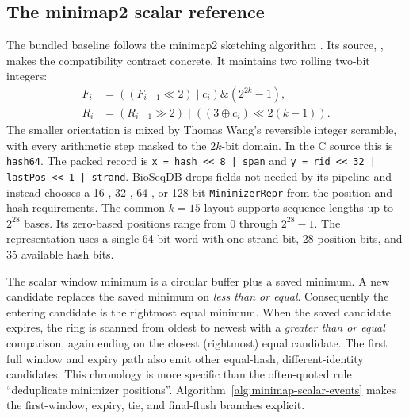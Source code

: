 \subsection{The minimap2 scalar reference}
\label{sec:minimap2-sketch}

The bundled baseline follows the minimap2 sketching algorithm
\cite{minimap2_paper}. Its source,
, makes the compatibility
contract concrete.  It maintains two rolling two-bit integers:
\[
\begin{aligned}
 F_i &= ((F_{i-1}\ll2)\mathbin{\vert}c_i)\mathbin{\&}(2^{2k}-1),\\
 R_i &= (R_{i-1}\gg2)\mathbin{\vert}((3\oplus c_i)\ll2(k-1)).
\end{aligned}
\]
The smaller orientation is mixed by Thomas Wang's reversible integer
scramble, with every arithmetic step masked to the $2k$-bit domain.  In the C
source this is \texttt{hash64}. The packed record is
\texttt{x = hash << 8 | span} and
\texttt{y = rid << 32 | lastPos << 1 | strand}.  BioSeqDB drops fields not
needed by its pipeline and instead chooses a 16-, 32-, 64-, or 128-bit
\texttt{MinimizerRepr} from the position and hash requirements.  The common
$k=15$ layout supports sequence lengths up to $2^{28}$ bases. Its zero-based
positions range from $0$ through $2^{28}-1$. The representation uses a single
64-bit word with one strand bit, 28 position bits, and 35 available hash bits.

The scalar window minimum is a circular buffer plus a saved minimum.  A new
candidate replaces the saved minimum on \emph{less than or equal}. Consequently
the entering candidate is the rightmost equal minimum.  When the saved
candidate expires, the ring is scanned from oldest to newest with a
\emph{greater than or equal} comparison, again ending on the closest
(rightmost) equal candidate.  The first full window and expiry path also emit
other equal-hash, different-identity candidates.  This chronology is more
specific than the often-quoted rule ``deduplicate minimizer positions''.
Algorithm~\ref{alg:minimap-scalar-events} makes the first-window, expiry, tie,
and final-flush branches explicit.

